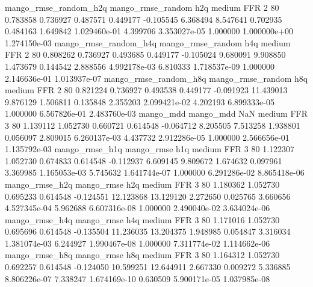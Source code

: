 mango_rmse_random_h2q mango_rmse_random                  h2q     medium      FFR                 2 80  0.783858       0.736927 0.487571       0.449177   -0.105545      6.368494      8.547641     0.702935       0.484163  1.649842 1.029460e-01     4.399706   3.353027e-05            1.000000    1.000000e+00        1.274150e-03
mango_rmse_random_h4q mango_rmse_random                  h4q     medium      FFR                 2 80  0.808262       0.736927 0.493685       0.449177   -0.105024      9.680091      9.908850     1.473679       0.144542  2.888556 4.992178e-03     6.810333   1.718537e-09            1.000000    2.146636e-01        1.013937e-07
mango_rmse_random_h8q mango_rmse_random                  h8q     medium      FFR                 2 80  0.821224       0.736927 0.493538       0.449177   -0.091923     11.439013      9.876129     1.506811       0.135848  2.355203 2.099421e-02     4.202193   6.899333e-05            1.000000    6.567826e-01        2.483760e-03
            mango_mdd         mango_mdd                  NaN     medium      FFR                 3 80  1.139112       1.052730 0.660721       0.614548   -0.064712      8.205505      7.513258     1.938801       0.056097  2.809015 6.260137e-03     4.437732   2.912286e-05            1.000000    2.566656e-01        1.135792e-03
       mango_rmse_h1q        mango_rmse                  h1q     medium      FFR                 3 80  1.122307       1.052730 0.674833       0.614548   -0.112937      6.609145      9.809672     1.674632       0.097961  3.369985 1.165053e-03     5.745632   1.641744e-07            1.000000    6.291286e-02        8.865418e-06
       mango_rmse_h2q        mango_rmse                  h2q     medium      FFR                 3 80  1.180362       1.052730 0.695233       0.614548   -0.124551     12.123868     13.129120     2.272650       0.025765  3.660656 4.527345e-04     5.962688   6.607316e-08            1.000000    2.490040e-02        3.634024e-06
       mango_rmse_h4q        mango_rmse                  h4q     medium      FFR                 3 80  1.171016       1.052730 0.695696       0.614548   -0.135504     11.236035     13.204375     1.948985       0.054847  3.316034 1.381074e-03     6.244927   1.990467e-08            1.000000    7.311774e-02        1.114662e-06
       mango_rmse_h8q        mango_rmse                  h8q     medium      FFR                 3 80  1.164312       1.052730 0.692257       0.614548   -0.124050     10.599251     12.644911     2.667330       0.009272  5.336885 8.806226e-07     7.338247   1.674169e-10            0.630509    5.900171e-05        1.037985e-08
